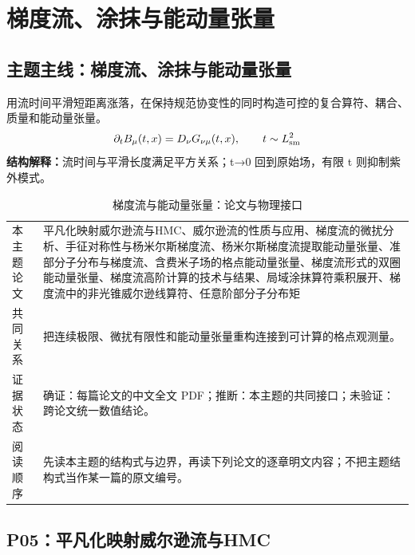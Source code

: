 \documentclass[UTF8,11pt,oneside]{ctexbook}
\begin{document}
\part{梯度流、涂抹与能动量张量}

\chapter*{主题主线：梯度流、涂抹与能动量张量}
用流时间平滑短距离涨落，在保持规范协变性的同时构造可控的复合算符、耦合、质量和能动量张量。
\begin{equation}
  \partial_t B_\mu(t,x)=D_\nu G_{\nu\mu}(t,x),\qquad t\sim L_{\rm sm}^{2}
\end{equation}
\noindent\textbf{结构解释：}流时间与平滑长度满足平方关系；t→0 回到原始场，有限 t 则抑制紫外模式。
\begin{table}[htbp]
  \centering
  \caption{梯度流与能动量张量：论文与物理接口}
  \small
  \begin{tabularx}{0.96\textwidth}{@{}p{3.3cm}>{\raggedright\arraybackslash}X@{}}
    \toprule
    本主题论文 & 平凡化映射威尔逊流与HMC、威尔逊流的性质与应用、梯度流的微扰分析、手征对称性与杨米尔斯梯度流、杨米尔斯梯度流提取能动量张量、准部分子分布与梯度流、含费米子场的格点能动量张量、梯度流形式的双圈能动量张量、梯度流高阶计算的技术与结果、局域涂抹算符乘积展开、梯度流中的非光锥威尔逊线算符、任意阶部分子分布矩 \\
    共同关系 & 把连续极限、微扰有限性和能动量张量重构连接到可计算的格点观测量。 \\
    证据状态 & 确证：每篇论文的中文全文 PDF；推断：本主题的共同接口；未验证：跨论文统一数值结论。 \\
    阅读顺序 & 先读本主题的结构式与边界，再读下列论文的逐章明文内容；不把主题结构式当作某一篇的原文编号。 \\
    \bottomrule
  \end{tabularx}
\end{table}

\chapter{P05：平凡化映射威尔逊流与HMC}
\end{document}
